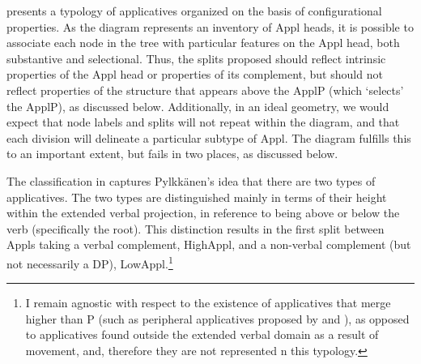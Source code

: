 \documentclass[output=paper,colorlinks,citecolor=brown,nonflat]{./langscibook}
\begin{document}
\addtocounter{footnote}{-1}
\addtocounter{footnote}{1}


 presents a typology of applicatives organized on the basis of configurational properties. As the diagram represents an inventory of Appl heads, it is possible to associate each node in the tree with particular features on the Appl head, both substantive and selectional. Thus, the splits proposed should reflect intrinsic properties of the Appl head or properties of its complement, but should not reflect properties of the structure that appears above the ApplP (which ‘selects’ the ApplP), as discussed below. Additionally, in an ideal geometry, we would expect that node labels and splits will not repeat within the diagram, and that each division will delineate a particular subtype of Appl. The diagram fulfills this to an important extent, but fails in two places, as discussed below.

The classification in  captures Pylkkänen’s idea that there are two types of applicatives. The two types are distinguished mainly in terms of their height within the extended verbal projection, in reference to being above or below the verb (specifically the root). This distinction results in the first split between Appls taking a verbal complement, HighAppl, and a non-verbal complement (but not necessarily a DP), LowAppl.\footnote{I remain agnostic with respect to the existence of applicatives that merge higher than \liv P (such as peripheral applicatives proposed by \citealt{Kim2011high} and \citealt{Tsai2018}), as opposed to applicatives found outside the extended verbal domain as a result of movement, and, therefore they are not represented n this typology.} 
\end{document}

